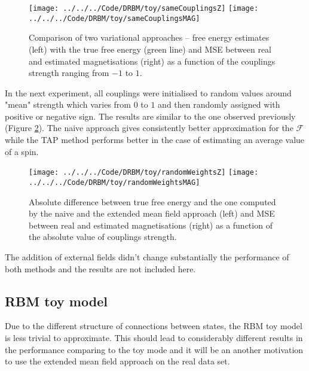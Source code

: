 \begin{figure}[!htb]
%
\texttt{[image: ../../../Code/DRBM/toy/sameCouplingsZ]}
\endminipage 
{}  
\texttt{[image: ../../../Code/DRBM/toy/sameCouplingsMAG]}
\endminipage\hfill
  \caption[Results on grid toy model with uniform couplings' strength]{Comparison of two  variational approaches -- free energy estimates (left) with the true free energy (green line) and MSE between real and estimated magnetisations (right) as a function of the couplings strength ranging from $-1$ to $1$.}
  \label{fig:gridModel}
\end{figure}

In the next experiment, all couplings were initialised to random values around "mean" strength which varies from $0$ to $1$ and then randomly assigned with positive or negative sign. The results are similar to the one observed previously (Figure \ref{fig:gridModelCoup}). The naive approach gives consistently better approximation for the $\mathcal{F}$ while the TAP method performs better in the case of estimating an average value of a spin. 

\begin{figure}[!htb]
%
\texttt{[image: ../../../Code/DRBM/toy/randomWeightsZ]}
\endminipage 
{}  
\texttt{[image: ../../../Code/DRBM/toy/randomWeightsMAG]}
\endminipage\hfill
  \caption[Results on grid toy model with random couplings' strength]{Absolute difference between true free energy and the one computed by the naive and the extended mean field approach (left) and MSE between real and estimated magnetisations (right) as a function of the absolute value of couplings strength.}
  \label{fig:gridModelCoup}
\end{figure}
The addition of external fields didn't change substantially the performance of both methods  and the results are not included here.

\subsection{RBM toy model}
Due to the different structure of connections between states, the RBM toy model is less trivial to approximate. This should lead to considerably different results in the performance comparing to the toy mode  and it will be an another motivation to use the extended mean field approach on the real data set.

